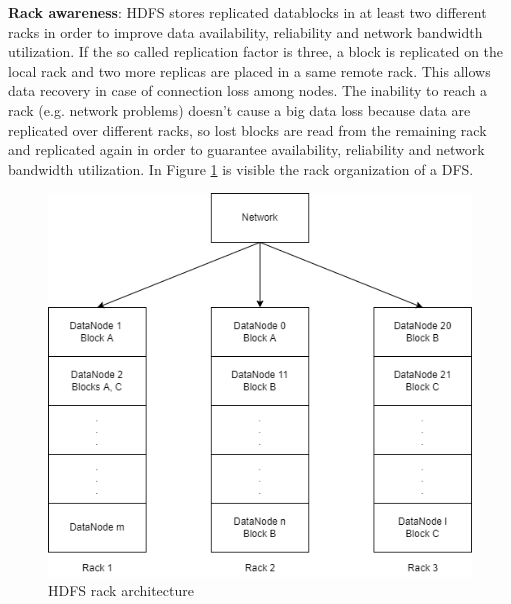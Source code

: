 \documentclass[\main/main.tex]{subfiles}
\begin{document}
\textbf{Rack awareness}: HDFS stores replicated datablocks in at least two different racks in order to improve data availability, reliability and network bandwidth utilization. If the so called replication factor is three, a block is replicated on the local rack and two more replicas are placed in a same remote rack. This allows data recovery in case of connection loss among nodes. The inability to reach a rack (e.g. network problems) doesn't cause a big data loss because data are replicated over different racks, so lost blocks are read from the remaining rack and replicated again in order to guarantee availability, reliability and network bandwidth utilization. In Figure \ref{fig:racks_dfs} is visible the rack organization of a DFS.
\begin{figure}[H]
    \centering
    \includegraphics[scale=.5]{images/cluster_computing/racks_dfs.png}
    \caption{HDFS rack architecture}
    \label{fig:racks_dfs}
\end{figure}
\end{document}
